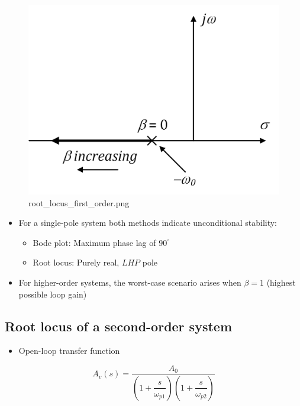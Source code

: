 \documentclass[11pt]{article}
\providecommand{\tightlist}{%
      \setlength{\itemsep}{0pt}\setlength{\parskip}{0pt}}
\begin{document}
    \begin{figure}
\centering
\includegraphics{root_locus_first_order.png}
\caption{root\_locus\_first\_order.png}
\end{figure}

    \begin{itemize}
\tightlist
\item
  For a single-pole system both methods indicate unconditional
  stability:

  \begin{itemize}
  \tightlist
  \item
    Bode plot: Maximum phase lag of \(90^{\circ}\)
  \item
    Root locus: Purely real, \(LHP\) pole
  \end{itemize}
\item
  For higher-order systems, the worst-case scenario arises when
  \(\beta = 1\) (highest possible loop gain)
\end{itemize}

    \hypertarget{root-locus-of-a-second-order-system}{%
\subsection{Root locus of a second-order
system}\label{root-locus-of-a-second-order-system}}

    \begin{itemize}
\tightlist
\item
  Open-loop transfer function
\end{itemize}

\begin{equation}
A_v(s) = \dfrac{A_0}{\left(1+\dfrac{s}{\omega_{p1}} \right) \left(1+\dfrac{s}{\omega_{p2}} \right)}
\end{equation}
\end{document}
